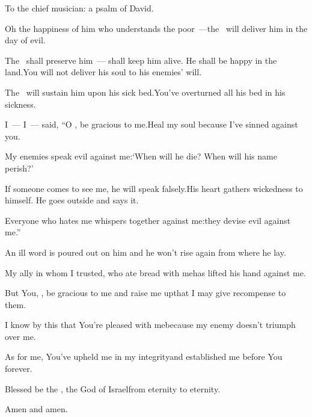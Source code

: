 
\begin{inparaenum}
  \noindent{} To the chief musician: a psalm of David.\smallskip%
  
  \pa {} Oh the happiness of him who understands the poor~---\pa the \lord\ will deliver him in the day of evil.%
  
  \pa {} The \lord\ shall preserve him~--- shall keep him alive. He shall be happy in the land.\pa You will not deliver his soul to his enemies' will.%
  
  \pa {} The \lord\ will sustain him upon his sick bed.\pa You've overturned all his bed in his sickness.%
  
  \pb {} I~--- I~--- said, ``O \lord, be gracious to me.\pa Heal my soul because I've sinned against you.%
  
  \pa {} My enemies speak evil against me:\pa `When will he die? When will his name perish?'%
  
  \pa {} If someone comes to see me, he will speak falsely.\pa His heart gathers wickedness to himself. He goes outside and says it.%
  
  \pa {} Everyone who hates me whispers together against me:\pa they devise evil against me.''%
  
  \pa {} An ill%
  word is poured out on him%
  and he won't rise again from where he lay.%
  
  \pa {} My ally in whom I trusted, who ate bread with me\pa has lifted his hand against me.%
  
  \pb {} But You, \lord, be gracious to me and raise me up\pa that I may give recompense to them.%
  
  \pa {} I know by this that You're pleased with me\pa because my enemy doesn't triumph over me.%
  
  \pa {} As for me, You've upheld me in my integrity\pa and established me before You forever.%
  
  \pa {} Blessed be the \lord, the God of Israel\pa from eternity to eternity.%
  
  \hfil Amen and amen.\hfil%
\end{inparaenum}
